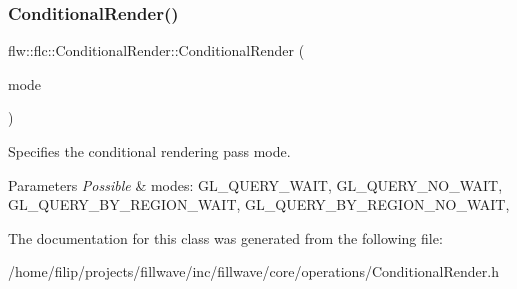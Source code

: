 \subsubsection{\texorpdfstring{Conditional\+Render()}{ConditionalRender()}}
{\footnotesize\ttfamily flw\+::flc\+::\+Conditional\+Render\+::\+Conditional\+Render (\begin{DoxyParamCaption}\item[{G\+Lenum}]{mode }\end{DoxyParamCaption})}



Specifies the conditional rendering pass mode. 


\begin{DoxyParams}{Parameters}
{\em Possible} & modes\+: G\+L\+\_\+\+Q\+U\+E\+R\+Y\+\_\+\+W\+A\+IT, G\+L\+\_\+\+Q\+U\+E\+R\+Y\+\_\+\+N\+O\+\_\+\+W\+A\+IT, G\+L\+\_\+\+Q\+U\+E\+R\+Y\+\_\+\+B\+Y\+\_\+\+R\+E\+G\+I\+O\+N\+\_\+\+W\+A\+IT, G\+L\+\_\+\+Q\+U\+E\+R\+Y\+\_\+\+B\+Y\+\_\+\+R\+E\+G\+I\+O\+N\+\_\+\+N\+O\+\_\+\+W\+A\+IT, \\
\hline
\end{DoxyParams}


The documentation for this class was generated from the following file\+:\begin{DoxyCompactItemize}
\item 
/home/filip/projects/fillwave/inc/fillwave/core/operations/Conditional\+Render.\+h\end{DoxyCompactItemize}
